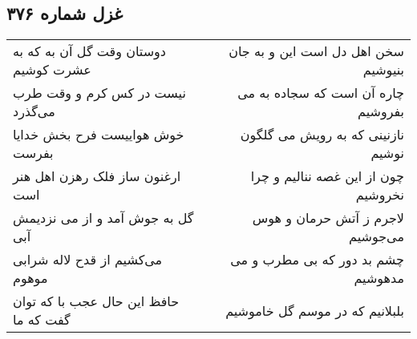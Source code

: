 \begin{center}
\section*{غزل شماره ۳۷۶}
\label{sec:sh376}
\begin{longtable}{l p{0.5cm} r}
دوستان وقت گل آن به که به عشرت کوشیم
&&
سخن اهل دل است این و به جان بنیوشیم
\\
نیست در کس کرم و وقت طرب می‌گذرد
&&
چاره آن است که سجاده به می بفروشیم
\\
خوش هواییست فرح بخش خدایا بفرست
&&
نازنینی که به رویش می گلگون نوشیم
\\
ارغنون ساز فلک رهزن اهل هنر است
&&
چون از این غصه ننالیم و چرا نخروشیم
\\
گل به جوش آمد و از می نزدیمش آبی
&&
لاجرم ز آتش حرمان و هوس می‌جوشیم
\\
می‌کشیم از قدح لاله شرابی موهوم
&&
چشم بد دور که بی مطرب و می مدهوشیم
\\
حافظ این حال عجب با که توان گفت که ما
&&
بلبلانیم که در موسم گل خاموشیم
\\
\end{longtable}
\end{center}
